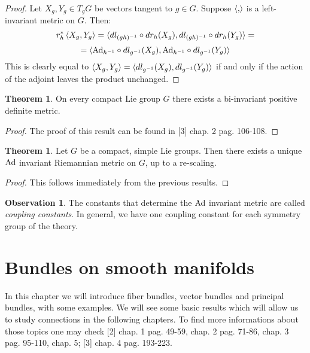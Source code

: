\documentclass[12pt,a4paper]{report}
\theoremstyle{definition}
\theoremstyle{Theorem}
\newtheorem{Theo}[Def]{Theorem}
\theoremstyle{definition}
\theoremstyle{definition}
\newtheorem{Obs}[Def]{Observation}
\begin{document}
	\begin{proof}
		Let $X_g,Y_g\in T_gG$ be vectors tangent to $g\in G$. Suppose $\braket{,}$ is a left-invariant metric on $G$. Then:
		$$r_h^*\braket{X_g,Y_g}=\braket{dl_{(gh)^{-1}}\circ dr_h(X_g),dl_{(gh)^{-1}}\circ dr_h(Y_g)}=$$
		$$=\braket{\hbox{Ad}_{h^{-1}}\circ dl_{g^{-1}}(X_g),\hbox{Ad}_{h^{-1}}\circ dl_{g^{-1}}(Y_g)}$$
		This is clearly equal to $\braket{X_g,Y_g}=\braket{dl_{g^{-1}}(X_g),dl_{g^{-1}}(Y_g)}$ if and only if the action of the adjoint leaves the product unchanged.
	\end{proof}
	\begin{Theo} \label{Scal_prod_theo_1}
		On every compact Lie group $G$ there exists a bi-invariant positive definite metric.
	\end{Theo}
	\begin{proof}
		The proof of this result can be found in [3] chap. 2 pag. 106-108.
	\end{proof}
	\begin{Theo}
		Let $G$ be a compact, simple Lie groups. Then there exists a unique $\hbox{Ad}$ invariant Riemannian metric on $G$, up to a re-scaling.
	\end{Theo}
	\begin{proof}
		This follows immediately from the previous results.
	\end{proof}
	\begin{Obs}
		The constants that determine the $\hbox{Ad}$ invariant metric are called \textit{coupling constants}. In general, we have one coupling constant for each symmetry group of the theory.
	\end{Obs}
	\chapter{Bundles on smooth manifolds}
	In this chapter we will introduce fiber bundles, vector bundles and principal bundles, with some examples. We will see some basic results which will allow us to study connections in the following chapters. To find more informations about those topics one may check [2] chap. 1 pag. 49-59, chap. 2 pag. 71-86, chap. 3 pag. 95-110, chap. 5; [3] chap. 4 pag. 193-223.
\end{document}
